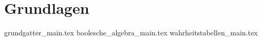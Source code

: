 
\part{Grundlagen}
\label{part-grundlagen}

{grundgatter_main.tex}
{boolesche_algebra_main.tex}
{wahrheitstabellen_main.tex}